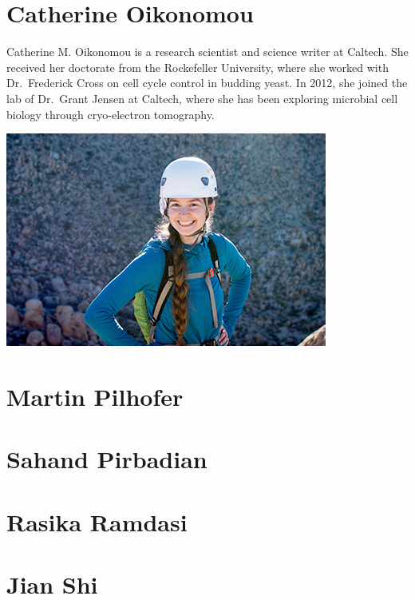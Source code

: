 \documentclass[]{tufte-book}
\begin{document}
\hypertarget{catherine_oikonomou}{%
\section*{Catherine Oikonomou}\label{catherine_oikonomou}}

Catherine M. Oikonomou is a research scientist and science writer at Caltech. She received her doctorate from the Rockefeller University, where she worked with Dr.~Frederick Cross on cell cycle control in budding yeast. In 2012, she joined the lab of Dr.~Grant Jensen at Caltech, where she has been exploring microbial cell biology through cryo-electron tomography.

\includegraphics{img/bios/catherine_oikonomou}

\hypertarget{martin_pilhofer}{%
\section*{Martin Pilhofer}\label{martin_pilhofer}}

\hypertarget{sahand_pirbadian}{%
\section*{Sahand Pirbadian}\label{sahand_pirbadian}}

\hypertarget{rasika_ramdasi}{%
\section*{Rasika Ramdasi}\label{rasika_ramdasi}}

\hypertarget{jian_shi}{%
\section*{Jian Shi}\label{jian_shi}}
\end{document}
